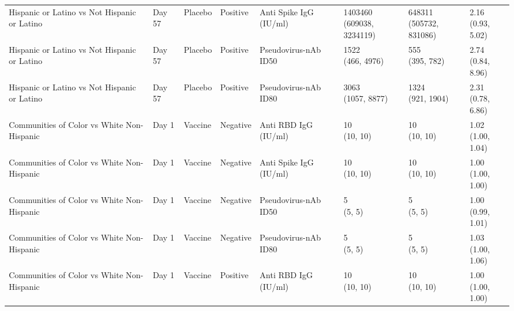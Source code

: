 \documentclass[]{book}
\theoremstyle{definition}
\theoremstyle{definition}
\theoremstyle{definition}
\newcommand{\1}{\mathbbm{1}}
\begin{document}
\begin{landscape}
\begin{ThreePartTable}
\begin{longtable}[t]{>{\raggedright\arraybackslash}p{2.7cm}lllllll}
\addlinespace
Hispanic or Latino vs Not Hispanic or Latino & Day 57 & Placebo & Positive & Anti Spike IgG (IU/ml) & \makecell[l]{1403460\\(609038, 3234119)} & \makecell[l]{648311\\(505732, 831086)} & \makecell[l]{2.16\\(0.93, 5.02)}\\
Hispanic or Latino vs Not Hispanic or Latino & Day 57 & Placebo & Positive & Pseudovirus-nAb ID50 & \makecell[l]{1522\\(466, 4976)} & \makecell[l]{555\\(395, 782)} & \makecell[l]{2.74\\(0.84, 8.96)}\\
Hispanic or Latino vs Not Hispanic or Latino & Day 57 & Placebo & Positive & Pseudovirus-nAb ID80 & \makecell[l]{3063\\(1057, 8877)} & \makecell[l]{1324\\(921, 1904)} & \makecell[l]{2.31\\(0.78, 6.86)}\\
Communities of Color vs White Non-Hispanic & Day 1 & Vaccine & Negative & Anti RBD IgG (IU/ml) & \makecell[l]{10\\(10, 10)} & \makecell[l]{10\\(10, 10)} & \makecell[l]{1.02\\(1.00, 1.04)}\\
Communities of Color vs White Non-Hispanic & Day 1 & Vaccine & Negative & Anti Spike IgG (IU/ml) & \makecell[l]{10\\(10, 10)} & \makecell[l]{10\\(10, 10)} & \makecell[l]{1.00\\(1.00, 1.00)}\\
\addlinespace
Communities of Color vs White Non-Hispanic & Day 1 & Vaccine & Negative & Pseudovirus-nAb ID50 & \makecell[l]{5\\(5, 5)} & \makecell[l]{5\\(5, 5)} & \makecell[l]{1.00\\(0.99, 1.01)}\\
Communities of Color vs White Non-Hispanic & Day 1 & Vaccine & Negative & Pseudovirus-nAb ID80 & \makecell[l]{5\\(5, 5)} & \makecell[l]{5\\(5, 5)} & \makecell[l]{1.03\\(1.00, 1.06)}\\
Communities of Color vs White Non-Hispanic & Day 1 & Vaccine & Positive & Anti RBD IgG (IU/ml) & \makecell[l]{10\\(10, 10)} & \makecell[l]{10\\(10, 10)} & \makecell[l]{1.00\\(1.00, 1.00)}\\

\end{longtable}
\end{ThreePartTable}
\end{landscape}
\end{document}
